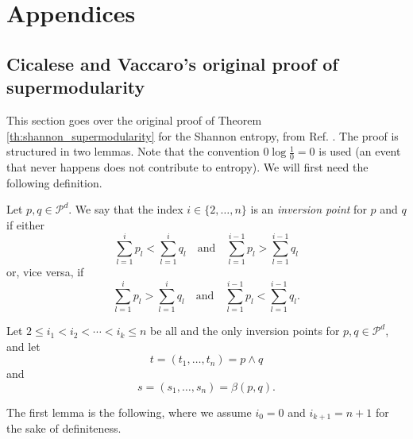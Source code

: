 \appendix
\chapter*{Appendices}
\renewcommand{\thesection}{\Alph{section}}
\renewcommand{\theequation}{\thesection.\arabic{equation}}
\renewcommand{\thefigure}{H.\arabic{figure}} \quad \setcounter{figure}{0} %



\section{Cicalese and Vaccaro's original proof of supermodularity} \label{app:supermodularity}

This section goes over the original proof of Theorem \ref{th:shannon_supermodularity} for the Shannon entropy, from Ref. \cite{cicalese_supermodularity_2002}. The proof is structured in two lemmas. Note that the convention $0 \log \frac{1}{0} = 0$ is used (an event that never happens does not contribute to entropy). We will first need the following definition.

\begin{appendix_definition}
    Let $p, q \in \mathcal{P}^d$. We say that the index $i \in \{2, \ldots, n\}$ is an \textit{inversion point} for $p$ and $q$ if either
\begin{equation}
    \sum_{l=1}^{i} p_l < \sum_{l=1}^{i} q_l \quad \text{and} \quad \sum_{l=1}^{i-1} p_l > \sum_{l=1}^{i-1} q_l    
\end{equation}
or, vice versa, if
\begin{equation}
    \sum_{l=1}^{i} p_l > \sum_{l=1}^{i} q_l \quad \text{and} \quad \sum_{l=1}^{i-1} p_l < \sum_{l=1}^{i-1} q_l.
\end{equation}
\end{appendix_definition}

\noindent Let $2 \leq i_1 < i_2 < \cdots < i_k \leq n$ be all and the only inversion points for $p, q \in \mathcal{P}^d$, and let
\begin{equation}
    t = (t_1, \ldots, t_n) = p \wedge q
\end{equation}
and
\begin{equation}
    s = (s_1, \ldots, s_n) = \beta(p, q).
\end{equation}

The first lemma is the following, where we assume $i_0 = 0$ and $i_{k+1} = n + 1$ for the sake of definiteness.


